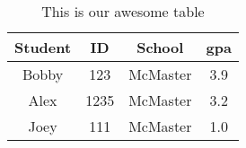 \documentclass{article}
\begin{document}
\begin{table}

  \begin{center}

    \caption{This is our awesome table}
    \label{tab:table1}

    \begin{tabular}{ | c | c | c | c |}
    	\hline
      		Student & ID & School & gpa \\
      \hline

     		Bobby & 123 & McMaster & 3.9 \\
     		Alex & 1235 & McMaster & 3.2 \\
     		Joey & 111 & McMaster & 1.0 \\

     \hline
    \end{tabular}
   


  \end{center}
\end{table}
\end{document}
